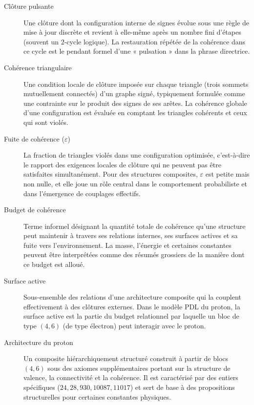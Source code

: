 \documentclass[11pt,a4paper]{article}
\theoremstyle{definition}
\begin{document}
\begin{description}
\item[Clôture pulsante]
Une clôture dont la configuration interne de signes évolue sous une règle de mise à jour discrète et revient à elle-même après un nombre fini d’étapes (souvent un \(2\)-cycle logique). La restauration répétée de la cohérence dans ce cycle est le pendant formel d’une « pulsation » dans la phrase directrice.\cite{Laubscher_IntroPDL_2024,Laubscher_Existence_PulsatingClosure_2026}

\item[Cohérence triangulaire]
Une condition locale de clôture imposée sur chaque triangle (trois sommets mutuellement connectés) d’un graphe signé, typiquement formulée comme une contrainte sur le produit des signes de ses arêtes. La cohérence globale d’une configuration est évaluée en comptant les triangles cohérents et ceux qui sont violés.\cite{Laubscher_EmergencePhysicalReality_2024,Laubscher_Leakage_Probability_2024}

\item[Fuite de cohérence (\(\varepsilon\))]
La fraction de triangles violés dans une configuration optimisée, c’est-à-dire le rapport des exigences locales de clôture qui ne peuvent pas être satisfaites simultanément. Pour des structures composites, \(\varepsilon\) est petite mais non nulle, et elle joue un rôle central dans le comportement probabiliste et dans l’émergence de couplages effectifs.\cite{Laubscher_Leakage_Probability_2024,Laubscher_Exponent18_v2_2024}

\item[Budget de cohérence]
Terme informel désignant la quantité totale de cohérence qu’une structure peut maintenir à travers ses relations internes, ses surfaces actives et sa fuite vers l’environnement. La masse, l’énergie et certaines constantes peuvent être interprétées comme des résumés grossiers de la manière dont ce budget est alloué.\cite{Laubscher_EmergencePhysicalReality_2024,Laubscher_Alpha_v2_2024,Laubscher_Existence_PulsatingClosure_2026}

\item[Surface active]
Sous-ensemble des relations d’une architecture composite qui la couplent effectivement à des clôtures externes. Dans le modèle PDL du proton, la surface active est la partie du budget relationnel par laquelle un bloc de type \((4,6)\) (de type électron) peut interagir avec le proton.\cite{Laubscher_ProtonArch_v2_2024,Laubscher_Born_Golden_v2_2024}

\item[Architecture du proton]
Un composite hiérarchiquement structuré construit à partir de blocs \((4,6)\) sous des axiomes supplémentaires portant sur la structure de valence, la connectivité et la cohérence. Il est caractérisé par des entiers spécifiques (\(24, 28, 930, 10087, 11017\)) et sert de base à des propositions structurelles pour certaines constantes physiques.\cite{Laubscher_ProtonArch_v2_2024,Laubscher_PDL_GlobalMapping_v6_2024}


\end{description}
\end{document}
